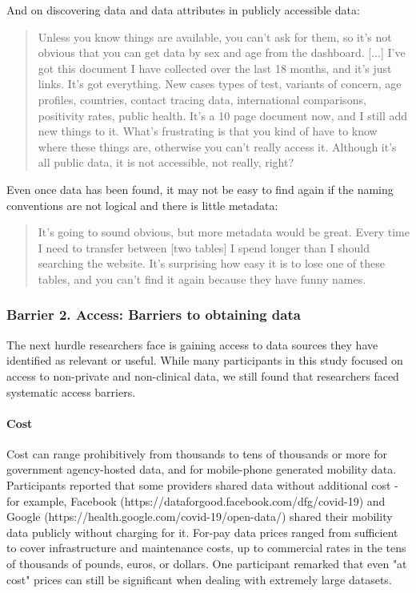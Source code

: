 \documentclass{CUP-JNL-DAP}%
\begin{document}
And on discovering data and data attributes in publicly accessible data: 

\blockquote{Unless you know things are available, you can't ask for them, so it's not obvious that you can get data by sex and age from the dashboard. [...] I've got this document I have collected over the last 18 months, and it's just links. It's got everything. New cases types of test, variants of concern, age profiles, countries, contact tracing data, international comparisons, positivity rates, public health. It's a 10 page document now, and I still add new things to it. What's frustrating is that you kind of have to know where these things are, otherwise you can't really access it. Although it's all public data, it is not accessible, not really, right?}

Even once data has been found, it may not be easy to find again if the naming conventions are not logical and there is little metadata: 

\blockquote {It's going to sound obvious, but more metadata would be great. Every time I need to transfer between [two tables] I spend longer than I should searching the website. It's surprising how easy it is to lose one of these tables, and you can't find it again because they have funny names.}

\subsubsection{Barrier 2. Access: Barriers to obtaining data}
The next hurdle researchers face is gaining access to data sources they have identified as relevant or useful. While many participants in this study focused on access to non-private and non-clinical data, we still found that researchers faced systematic access barriers. 

\paragraph{Cost}
Cost can range prohibitively from thousands to tens of thousands or more for government agency-hosted data, and for mobile-phone generated mobility data. Participants reported that some providers shared data without additional cost - for example, Facebook (https://dataforgood.facebook.com/dfg/covid-19) and Google (https://health.google.com/covid-19/open-data/) shared their mobility data publicly without charging for it. For-pay data prices ranged from sufficient to cover infrastructure and maintenance costs, up to commercial rates in the tens of thousands of pounds, euros, or dollars. One participant remarked that even "at cost" prices can still be significant when dealing with extremely large datasets. 
\end{document}
